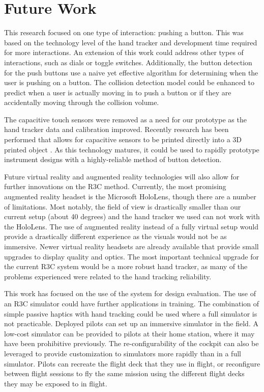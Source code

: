\section{Future Work}

This research focused on one type of interaction: pushing a button.
This was based on the technology level of the hand tracker and development time required for more interactions.
An extension of this work could address other types of interactions, such as dials or toggle switches.
Additionally, the button detection for the push buttons use a naive yet effective algorithm for determining when the user is pushing on a button.
The collision detection model could be enhanced to predict when a user is actually moving in to push a button or if they are accidentally moving through the collision volume.

The capacitive touch sensors were removed as a need for our prototype as the hand tracker data and calibration improved.
Recently research has been performed that allows for capacitive sensors to be printed directly into a 3D printed object \citep{shemelya_3d_2013,kwok_electrically_2017}.
As this technology matures, it could be used to rapidly prototype instrument designs with a highly-reliable method of button detection.

Future virtual reality and augmented reality technologies will also allow for further innovations on the R3C method.
Currently, the most promising augmented reality headset is the Microsoft HoloLens, though there are a number of limitations.
Most notably, the field of view is drastically smaller than our current setup (about 40 degrees) and the hand tracker we used can not work with the HoloLens.
The use of augmented reality instead of a fully virtual setup would provide a drastically different experience as the visuals would not be as immersive.
Newer virtual reality headsets are already available that provide small upgrades to display quality and optics.
The most important technical upgrade for the current R3C system would be a more robust hand tracker, as many of the problems experienced were related to the hand tracking reliability.

This work has focused on the use of the system for design evaluation.
The use of an R3C simulator could have further applications in training.
The combination of simple passive haptics with hand tracking could be used where a full simulator is not practicable.
Deployed pilots can set up an immersive simulator in the field.
A low-cost simulator can be provided to pilots at their home station, where it may have been prohibitive previously.
The re-configurability of the cockpit can also be leveraged to provide customization to simulators more rapidly than in a full simulator.
Pilots can recreate the flight deck that they use in flight, or reconfigure between flight sessions to fly the same mission using the different flight decks they may be exposed to in flight.


